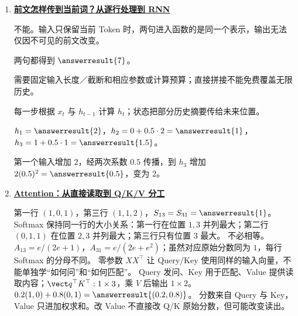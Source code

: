 \begin{enumerate}[leftmargin=5.4em,labelsep=.7em,itemsep=9pt]
\par{}
\item[\textbf{第 13 章}] \label{answer:21-rnn}\textbf{\hyperref[check:21-rnn]{前文怎样传到当前词？从逐行处理到 RNN}}\par\nobreak
{}不能。输入只保留当前 Token 时，两句进入函数的是同一个表示，输出无法仅因不可见的前文改变。
\par{}两句都得到 $\answerresult{7}$。
\par{}需要固定输入长度／截断和相应参数或计算预算；直接拼接不能免费覆盖无限历史。
\par{}每一步根据 $x_t$ 与 $h_{t-1}$ 计算 $h_t$；状态把部分历史摘要传给未来位置。
\par{}$h_1=\answerresult{2}$，$h_2=0+0.5\cdot2=\answerresult{1}$，$h_3=1+0.5\cdot1=\answerresult{1.5}$。
\par{}第一个输入增加 $2$，经两次系数 $0.5$ 传播，到 $h_3$ 增加 $2(0.5)^2=\answerresult{0.5}$，变为 $2$。
\par{}
\item[\textbf{第 14 章}] \label{answer:21c-naive-attention}\textbf{\hyperref[check:21c-naive-attention]{Attention：从直接读取到 Q/K/V 分工}}\par\nobreak
{}\label{answer:21b-why-attention}
第一行 $(1,0,1)$，第三行 $(1,1,2)$，$S_{13}=S_{31}=\answerresult{1}$。Softmax 保持同一行的大小关系：第一行在位置 $1,3$ 并列最大；第二行 $(0,1,1)$ 在位置 $2,3$ 并列最大；第三行只有位置 $3$ 最大。
不必相等。$A_{13}=e/(2e+1)$，$A_{31}=e/(2e+e^2)$；虽然对应原始分数同为 $1$，每行 Softmax 的分母不同。
零参数 $XX^\top$ 让 Query/Key 使用同样的输入向量，不能单独学“如何问”和“如何匹配”。
Query 发问、Key 用于匹配、Value 提供读取内容；$\vect q^\top K^\top:1\times3$，乘 $V$ 后输出 $1\times2$。
$0.2(1,0)+0.8(0,1)=\answerresult{(0.2,0.8)}$。
分数来自 Query 与 Key，Value 只进加权求和。改 Value 不直接改 Q/K 原始分数，但可能改变读出。

\end{enumerate}
